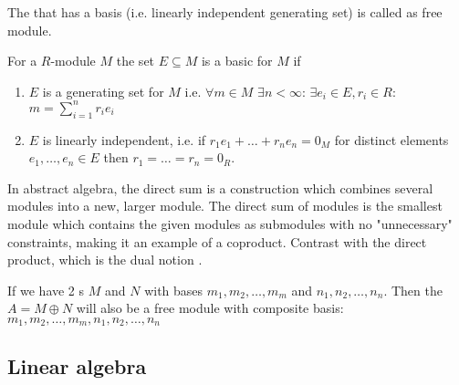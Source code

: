 \begin{appendices}
\begin{definition}
  The  that has a basis (i.e. linearly independent
  generating set) 
  is called as free module.

  For a $R$-module $M$ the set $E \subseteq M$ is a basic for $M$ if
  \begin{enumerate}
  \item $E$ is a generating set for $M$ i.e. $\forall m \in M$
    $\exists n < \infty$: $\exists e_i \in E, r_i \in R$:
    $m = \sum_{i = 1}^n r_i e_i$
  \item $E$ is linearly independent, i.e. if $r_1 e_1 + \dots + r_n
    e_n = 0_M$ for distinct elements $e_1, \dots, e_n \in E$ then
    $r_1 = \dots = r_n = 0_R$.
  \end{enumerate}
  \label{def:freemodule}
\end{definition}

\begin{definition}
  In abstract algebra, the direct sum is a construction which combines
  several modules into a new, larger module. The direct sum of modules
  is the smallest module which contains the given modules as
  submodules with no "unnecessary" constraints, making it an example
  of a coproduct. Contrast with the direct product, which is the dual
  notion \cite{wiki:directsummodules}.
  \label{def:directsummodules}
\end{definition}

\begin{example}
  If we have 2 s $M$ and $N$ with bases $m_1,
  m_2, \dots, m_m$ and $n_1, n_2, \dots, n_n$. Then the
   $A = M \oplus N$ will also be a free
  module with composite basis: $m_1, m_2, \dots, m_m, n_1, n_2, \dots, n_n$
  \label{ex:directsummodules}
\end{example}


\subsection{Linear algebra}


\end{appendices}
